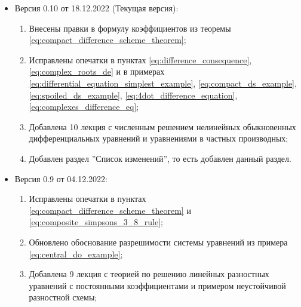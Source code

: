 \documentclass{article}
\begin{document}

\begin{itemize}[nosep]
\item Версия 0.10 от 18.12.2022 (Текущая версия):
	\begin{enumerate}[nosep]
		\item Внесены правки в формулу коэффициентов из
			теоремы
			\eqref{eq:compact_difference_scheme_theorem};
		\item Исправлены опечатки в пунктах
			\eqref{eq:difference_consequence},
			\eqref{eq:complex_roots_de}
			и в примерах
			\eqref{eq:differential_equation_simplest_example},
			\eqref{eq:compact_ds_example},
			\eqref{eq:spoiled_ds_example},
			\eqref{eq:4dot_difference_equation},
			\eqref{eq:complexes_difference_eq};
		\item Добавлена 10 лекция с численным решением нелинейных
			обыкновенных дифференциальных уравнений и уравнениями
			в частных производных;
		\item Добавлен раздел ''Список изменений'', то есть добавлен
			данный раздел.
	\end{enumerate}

\item Версия 0.9 от 04.12.2022:
	\begin{enumerate}[nosep]
		\item Исправлены опечатки в пунктах
			\eqref{eq:compact_difference_scheme_theorem} и
			\eqref{eq:composite_simpsons_3_8_rule};
		\item Обновлено обоснование разрешимости системы уравнений из
			примера \eqref{eq:central_do_example};
		\item Добавлена 9 лекция с теорией по решению линейных
			разностных уравнений с постоянными коэффициентами и
			примером неустойчивой разностной схемы;
	\end{enumerate}
\end{itemize}
\end{document}
